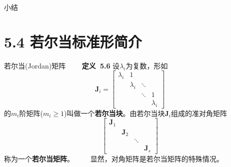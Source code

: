 \documentclass[compress,mathserif,cjk]{beamer}
\theoremstyle{remark}
\numberwithin{equation}{section}
\newcommand{\hei}{\bf}      %
\begin{document}
\begin{CJK}{UTF8}{gbsn}
\begin{frame}{小结}
\end{frame}

\section[5.4]{5.4 若尔当标准形简介}

\begin{frame}{若尔当(Jordan)矩阵}\small
\ \ \ \ {\hei 定义~5.6} 设$\lambda_i$为复数，形如
$$\bm J_i=\left[\begin{matrix}\lambda_i&1&&\\&\lambda_i&\ddots&\\&&\ddots&1\\&&&\lambda_i\end{matrix}\right]$$
的$m_i$阶矩阵($m_i\geq1$)叫做一个{\hei 若尔当块}。由若尔当块$\bm J_i$组成的准对角矩阵
$$\left[\begin{matrix}\bm J_1&&&\\&\bm J_2&&\\&&\ddots&\\&&&\bm J_s\end{matrix}\right]$$
称为一个{\hei 若尔当矩阵}。
\pause\vskip 5pt
\ \ \ \ 显然，对角矩阵是若尔当矩阵的特殊情况。
\end{frame}


\end{CJK}
\end{document}
